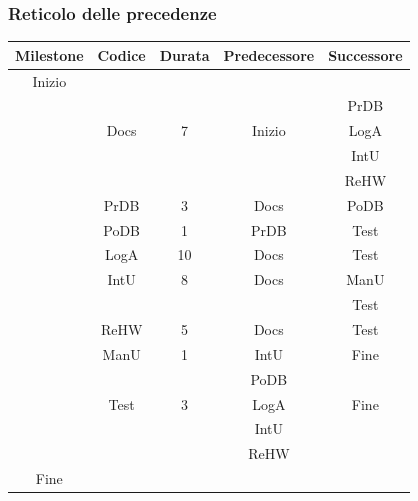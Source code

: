 \documentclass[a4paper,12pt]{beamer}
\begin{document}
\begin{frame}
\frametitle{Reticolo delle precedenze}
\footnotesize{
\begin{table}[ht]
\begin{center}
\begin{tabular}{c | c | c | c | c}
\rowcolor{Ash}
\hline
Milestone & Codice    					     & Durata & Predecessore & Successore \\ \hline
Inizio        & 	       		    					     &  		 &  				  &  \\ \hline
& & &  & PrDB \\
& Docs  & 7 & Inizio & LogA \\
& & &  & IntU \\
& & &  & ReHW \\ \hline
& PrDB   	    & 3 & Docs & PoDB \\ \hline
& PoDB    	    & 1 & PrDB & Test \\ \hline
& LogA        & 10 & Docs & Test \\ \hline
& IntU       			    & 8 & Docs & ManU \\ 
& & & &  Test \\ \hline
& ReHW   &  5 & Docs & Test \\ \hline
& ManU    &  1 & IntU & Fine \\ \hline
& & &  PoDB & \\
& Test       						    & 3  & LogA & Fine \\ 
& & &  IntU & \\
& & &  ReHW & \\ \hline
Fine & 						    &  &  &  \\\hline
\end{tabular}
\end{center}
\end{table}}
\end{frame}

\pagebreak
\end{document}

